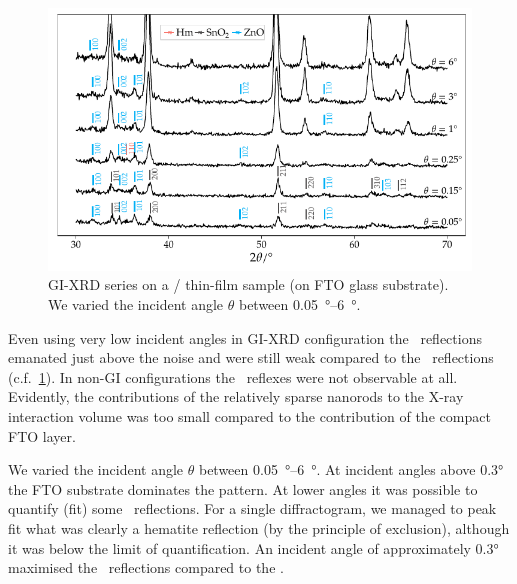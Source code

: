 \documentclass[webedition,openright,titles,swedish,english]{LuaUUThesis}\usepackage[]{graphicx}\usepackage[]{xcolor}
\newenvironment{knitrout}{}{} %
\newcommand{\cf}{c.f.}
\begin{document}
\begin{figure}[tbp]
\centering
\begin{knitrout}\scriptsize
{}\color{fgcolor}

{\centering \includegraphics[width=4.72in]{figure/0503P-fig-gixrd-exp-1} 

}


\end{knitrout}
\caption[GI-XRD /]{%
   GI-XRD series on a / thin-film sample (on \gls{FTO} glass substrate).
   We varied the incident angle $\theta$ between
   \qtyrange[range-phrase=\ensuremath{\text{ and }}]{0.05}{6}{\degree}.
}
\label{fig:P03-gixrd-exp}
\end{figure}

Even using very low incident angles in \gls{GI-XRD} configuration
the \ZnO\ reflections emanated just above the noise and were still weak compared to
the \tinox\ reflections (\cf\ \cref{fig:P03-gixrd-exp}).
In non-GI configurations the \ZnO\ reflexes were not observable at all.
Evidently, the contributions of the relatively sparse nanorods
to the X-ray interaction volume
was too small compared to the contribution of the compact \gls{FTO} layer.

We varied the incident angle $\theta$ between
\qtyrange[range-phrase=\ensuremath{\text{ and }}]{0.05}{6}{\degree}.
At incident angles above \ang{0.3} the \gls{FTO} substrate dominates the pattern.
At lower angles it was possible to quantify (fit) some \zincox\ reflections.
For a single diffractogram, we managed to peak fit what was clearly a \gls{hematite}
reflection (by the principle of exclusion), although it was below the limit of
quantification.
An incident angle of approximately \ang{0.3}
maximised the \ZnO\ reflections compared to the \tinox.
\end{document}
